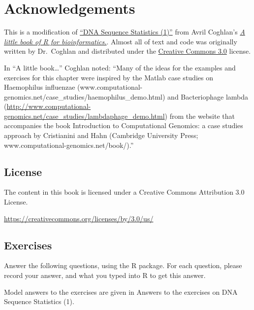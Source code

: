 \documentclass[
]{book}
\begin{document}
\hypertarget{acknowledgements}{%
\section{Acknowledgements}\label{acknowledgements}}

This is a modification of \href{https://a-little-book-of-r-for-bioinformatics.readthedocs.io/en/latest/src/chapter1.html}{``DNA Sequence Statistics (1)''} from Avril Coghlan's \href{https://a-little-book-of-r-for-bioinformatics.readthedocs.io/en/latest/index.html}{\emph{A little book of R for bioinformatics.}}. Almost all of text and code was originally written by Dr.~Coghlan and distributed under the \href{https://creativecommons.org/licenses/by/3.0/us/}{Creative Commons 3.0} license.

In ``A little book\ldots{}'' Coghlan noted: ``Many of the ideas for the examples and exercises for this chapter were inspired by the Matlab case studies on Haemophilus influenzae (www.computational-genomics.net/case\_studies/haemophilus\_demo.html) and Bacteriophage lambda (\url{http://www.computational-genomics.net/case_studies/lambdaphage_demo.html}) from the website that accompanies the book Introduction to Computational Genomics: a case studies approach by Cristianini and Hahn (Cambridge University Press; www.computational-genomics.net/book/).''

\hypertarget{license}{%
\subsection{License}\label{license}}

The content in this book is licensed under a Creative Commons Attribution 3.0 License.

\url{https://creativecommons.org/licenses/by/3.0/us/}

\hypertarget{exercises}{%
\subsection{Exercises}\label{exercises}}

Answer the following questions, using the R package. For each question, please record your answer, and what you typed into R to get this answer.

Model answers to the exercises are given in Answers to the exercises on DNA Sequence Statistics (1).
\end{document}
